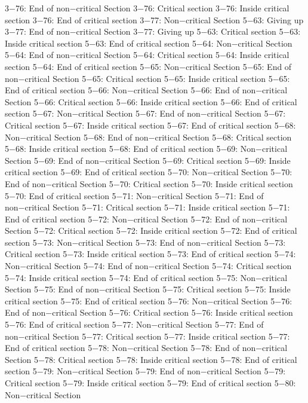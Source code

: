 3−76: End of non−critical Section
3−76: Critical section
3−76: Inside critical section
3−76: End of critical section
3−77: Non−critical Section
5−63: Giving up
3−77: End of non−critical Section
3−77: Giving up
5−63: Critical section
5−63: Inside critical section
5−63: End of critical section
5−64: Non−critical Section
5−64: End of non−critical Section
5−64: Critical section
5−64: Inside critical section
5−64: End of critical section
5−65: Non−critical Section
5−65: End of non−critical Section
5−65: Critical section
5−65: Inside critical section
5−65: End of critical section
5−66: Non−critical Section
5−66: End of non−critical Section
5−66: Critical section
5−66: Inside critical section
5−66: End of critical section
5−67: Non−critical Section
5−67: End of non−critical Section
5−67: Critical section
5−67: Inside critical section
5−67: End of critical section
5−68: Non−critical Section
5−68: End of non−critical Section
5−68: Critical section
5−68: Inside critical section
5−68: End of critical section
5−69: Non−critical Section
5−69: End of non−critical Section
5−69: Critical section
5−69: Inside critical section
5−69: End of critical section
5−70: Non−critical Section
5−70: End of non−critical Section
5−70: Critical section
5−70: Inside critical section
5−70: End of critical section
5−71: Non−critical Section
5−71: End of non−critical Section
5−71: Critical section
5−71: Inside critical section
5−71: End of critical section
5−72: Non−critical Section
5−72: End of non−critical Section
5−72: Critical section
5−72: Inside critical section
5−72: End of critical section
5−73: Non−critical Section
5−73: End of non−critical Section
5−73: Critical section
5−73: Inside critical section
5−73: End of critical section
5−74: Non−critical Section
5−74: End of non−critical Section
5−74: Critical section
5−74: Inside critical section
5−74: End of critical section
5−75: Non−critical Section
5−75: End of non−critical Section
5−75: Critical section
5−75: Inside critical section
5−75: End of critical section
5−76: Non−critical Section
5−76: End of non−critical Section
5−76: Critical section
5−76: Inside critical section
5−76: End of critical section
5−77: Non−critical Section
5−77: End of non−critical Section
5−77: Critical section
5−77: Inside critical section
5−77: End of critical section
5−78: Non−critical Section
5−78: End of non−critical Section
5−78: Critical section
5−78: Inside critical section
5−78: End of critical section
5−79: Non−critical Section
5−79: End of non−critical Section
5−79: Critical section
5−79: Inside critical section
5−79: End of critical section
5−80: Non−critical Section
